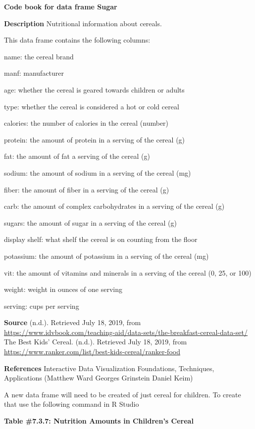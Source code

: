 \documentclass[]{book}
\newenvironment{Shaded}{\begin{snugshade}}{\end{snugshade}}
\newcommand{\KeywordTok}[1]{\textcolor[rgb]{0.13,0.29,0.53}{\textbf{#1}}}
\newcommand{\NormalTok}[1]{#1}
\newcommand{\OperatorTok}[1]{\textcolor[rgb]{0.81,0.36,0.00}{\textbf{#1}}}
\newcommand{\StringTok}[1]{\textcolor[rgb]{0.31,0.60,0.02}{#1}}
\begin{document}
\textbf{Code book for data frame Sugar}

\textbf{Description}
Nutritional information about cereals.

This data frame contains the following columns:

name: the cereal brand

manf: manufacturer

age: whether the cereal is geared towards children or adults

type: whether the cereal is considered a hot or cold cereal

calories: the number of calories in the cereal (number)

protein: the amount of protein in a serving of the cereal (g)

fat: the amount of fat a serving of the cereal (g)

sodium: the amount of sodium in a serving of the cereal (mg)

fiber: the amount of fiber in a serving of the cereal (g)

carb: the amount of complex carbohydrates in a serving of the cereal (g)

sugars: the amount of sugar in a serving of the cereal (g)

display shelf: what shelf the cereal is on counting from the floor

potassium: the amount of potassium in a serving of the cereal (mg)

vit: the amount of vitamins and minerals in a serving of the cereal (0, 25, or 100)

weight: weight in ounces of one serving

serving: cups per serving

\textbf{Source}
(n.d.). Retrieved July 18, 2019, from \url{https://www.idvbook.com/teaching-aid/data-sets/the-breakfast-cereal-data-set/}
The Best Kids' Cereal. (n.d.). Retrieved July 18, 2019, from \url{https://www.ranker.com/list/best-kids-cereal/ranker-food}

\textbf{References}
Interactive Data Visualization
Foundations, Techniques, Applications (Matthew Ward \textbar{} Georges Grinstein \textbar{} Daniel Keim)

A new data frame will need to be created of just cereal for children. To create that use the following command in R Studio

\textbf{Table \#7.3.7: Nutrition Amounts in Children's Cereal}

\begin{Shaded}
\end{Shaded}
\end{document}
